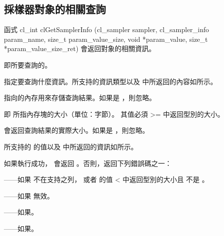 \subsection{採樣器對象的相關查詢}

函式
\startCLFUNC
cl_int clGetSamplerInfo (cl_sampler sampler,
			cl_sampler_info param_name,
			size_t param_value_size,
			void *param_value,
			size_t *param_value_size_ret)
\stopCLFUNC
會返回對象的相關資訊。

 即所要查詢的。

 指定要查詢什麼資訊。所支持的資訊類型以及  中所返回的內容如所示。

 指向的內存用來存儲查詢結果。如果是 ，則忽略。

 即  所指內存塊的大小（單位：字節）。
其值必須 >= 中返回型別的大小。

 會返回查詢結果的實際大小。如果是 ，則忽略。

 所支持的  的值以及  中所返回的資訊如所示。

{}

如果執行成功， 會返回 。否則，返回下列錯誤碼之一：
\startigBase
\item {}——如果  不在支持之列，
  或者  的值 < 中返回型別的大小且  不是 。
\item {}——如果  無效。
\item {}——如果\scdevfailres。
\item {}——如果\schostfailres。
\stopigBase

